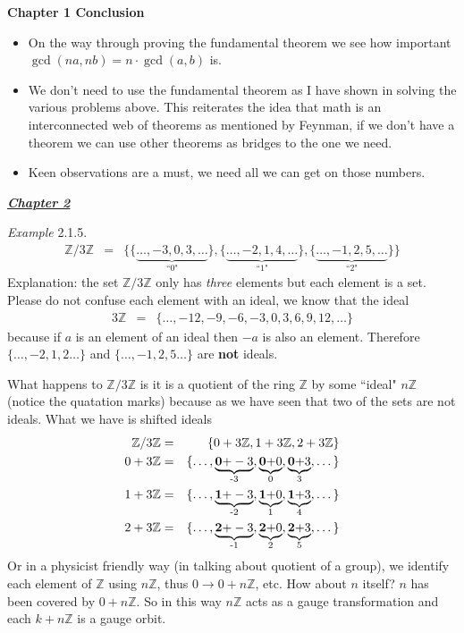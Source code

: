\documentclass[aps,preprint,preprintnumbers,nofootinbib,showpacs,prd]{revtex4-1}
\newcommand{\bit}{\begin{itemize}}
\newcommand{\eit}{\end{itemize}}
\newcommand{\nbea}{\begin{eqnarray*}}
\newcommand{\neea}{\end{eqnarray*}}
\begin{document}
{\bf Chapter 1 Conclusion}
%
\bit
\item On the way through proving the fundamental theorem we see how important $\gcd(na,nb) = n \cdot \gcd(a,b)$ is.
\item We don't need to use the fundamental theorem as I have shown in solving the various problems above. This reiterates the idea that math is an interconnected web of theorems as mentioned by Feynman, if we don't have a theorem we can use other theorems as bridges to the one we need.
\item Keen observations are a must, we need all we can get on those numbers.
\eit
%

\bigskip
\underline{\textbf{\textit{Chapter 2}}}
\bigskip

{\it Example }2.1.5.
%
\nbea
\mathbb{Z}/3\mathbb{Z} & = & \{ \{\underbrace{\dots, -3,0,3, \dots}_\text{``0"}\}, \{\underbrace{\dots, -2,1,4, \dots}_\text{``1"}\}, \{\underbrace{\dots, -1,2,5, \dots}_\text{``2"}\} \}
\neea
%
Explanation: the set $\mathbb{Z}/3\mathbb{Z}$ only has {\it three} elements but each element is a set. Please do not confuse each element with an ideal, we know that the ideal
%
\nbea
3\mathbb{Z} & = & \{\dots, -12,-9,-6,-3,0,3,6,9,12, \dots\}
\neea
%
because if $a$ is an element of an ideal then $-a$ is also an element. Therefore $\{\dots, -2,1,2 \dots\}$ and $\{\dots, -1,2,5 \dots\}$ are {\bf not} ideals.

What happens to $\mathbb{Z}/3\mathbb{Z}$ is it is a quotient of the ring $\mathbb{Z}$ by some ``ideal" $n\mathbb{Z}$ (notice the quatation marks) because as we have seen that two of the sets are not ideals. What we have is shifted ideals
%
\nbea
\mathbb{Z}/3\mathbb{Z} & = & \{ 0 + 3\mathbb{Z}, 1 + 3\mathbb{Z}, 2 + 3\mathbb{Z}\} \\
0 + 3\mathbb{Z} & = & \{\dots, \underbrace{{\bf 0+}-3}_\text{-3},\underbrace{{\bf 0+}0}_\text{0}, \underbrace{{\bf 0+}3}_\text{3}, \dots\} \\
1 + 3\mathbb{Z} & = & \{\dots, \underbrace{{\bf 1+}-3}_\text{-2},\underbrace{{\bf 1+}0}_\text{1},\underbrace{{\bf 1+}3}_\text{4}, \dots\} \\
2 + 3\mathbb{Z} & = & \{\dots, \underbrace{{\bf 2+}-3}_\text{-1},\underbrace{{\bf 2+}0}_\text{2},\underbrace{{\bf 2+}3}_\text{5}, \dots\}
\neea
%
Or in a physicist friendly way (in talking about quotient of a group), we identify each element of $\mathbb{Z}$ using $n\mathbb{Z}$, thus $0 \to 0 + n\mathbb{Z}$, etc. How about $n$ itself? $n$ has been covered by $0 + n\mathbb{Z}$. So in this way $n\mathbb{Z}$ acts as a gauge transformation and each $k + n\mathbb{Z}$ is a gauge orbit.
\end{document}
